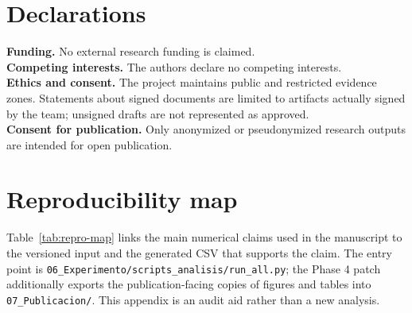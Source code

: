 \documentclass[pdflatex,sn-basic]{sn-jnl}
\begin{document}
\section*{Declarations}
\textbf{Funding.} No external research funding is claimed.\\
\textbf{Competing interests.} The authors declare no competing interests.\\
\textbf{Ethics and consent.} The project maintains public and restricted evidence zones. Statements about signed documents are limited to artifacts actually signed by the team; unsigned drafts are not represented as approved.\\
\textbf{Consent for publication.} Only anonymized or pseudonymized research outputs are intended for open publication.


\appendix
\section{Reproducibility map}\label{app:repro}
Table~\ref{tab:repro-map} links the main numerical claims used in the manuscript to the versioned input and the generated CSV that supports the claim. The entry point is \texttt{06\_Experimento/scripts\_analisis/run\_all.py}; the Phase 4 patch additionally exports the publication-facing copies of figures and tables into \texttt{07\_Publicacion/}. This appendix is an audit aid rather than a new analysis.
\end{document}
